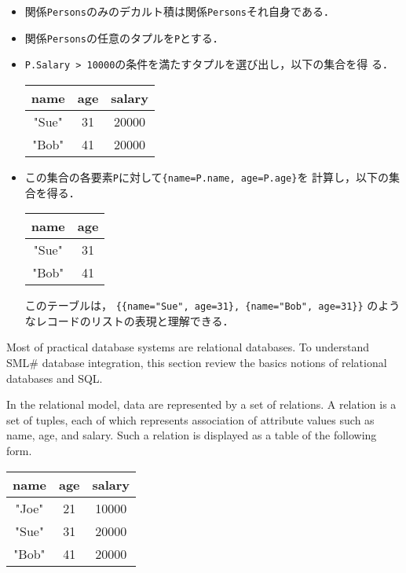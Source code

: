 \documentclass{jbook}
\newcommand{\smlsharp}{SML\#}
\begin{document}
\begin{itemize}
\item 関係{\tt Persons}のみのデカルト積は関係{\tt Persons}それ自身である．
\item 関係{\tt Persons}の任意のタプルを{\tt P}とする．
\item {\tt P.Salary > 10000}の条件を満たすタプルを選び出し，以下の集合を得
る．

\begin{center}
\begin{tabular}{|c|c|c|}
\hline
name & age & salary
\\\hline
"Sue" & 31 & 20000
\\\hline
"Bob" & 41 & 20000
\\\hline
\end{tabular}
\end{center}
\item この集合の各要素{\tt P}に対して{\tt \{name=P.name, age=P.age\}}を
計算し，以下の集合を得る．

\begin{center}
\begin{tabular}{|c|c|}
\hline
name & age
\\\hline
"Sue" & 31
\\\hline
"Bob" & 41
\\\hline
\end{tabular}
\end{center}
このテーブルは，
{\tt \{\{name="Sue", age=31\}, \{name="Bob", age=31\}\}}
のようなレコードのリストの表現と理解できる．
\end{itemize}
\else%
	Most of practical database systems are relational databases.
	To understand \smlsharp{} database integration, this section
review the basics notions of relational databases and SQL.

	In the relational model, data are represented by a set of
relations.
	A relation is a set of tuples, each of which represents
association of attribute values such as name, age, and salary.
	Such a relation is displayed as a table of the following form.

\begin{center}
\begin{tabular}{|c|c|c|}
\hline
name & age & salary
\\\hline
"Joe" & 21 & 10000
\\\hline
"Sue" & 31 & 20000
\\\hline
"Bob" & 41 & 20000
\\\hline
\end{tabular}
\end{center}
\end{document}
